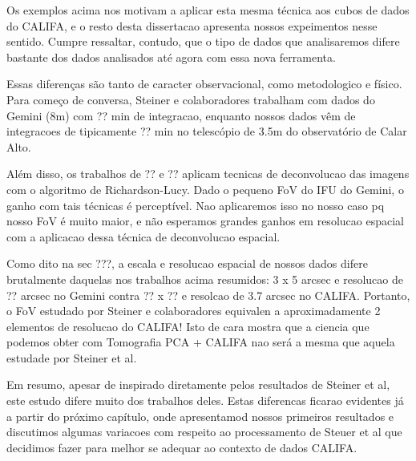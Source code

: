Os exemplos acima nos motivam a aplicar esta mesma técnica aos cubos de dados do CALIFA, e o resto desta dissertacao apresenta nossos expeimentos nesse sentido. Cumpre ressaltar, contudo, que o tipo de dados que analisaremos difere bastante dos dados analisados até agora com essa nova ferramenta. 


Essas diferenças são tanto de caracter observacional, como metodologico e físico. Para começo de conversa, Steiner e colaboradores trabalham com dados do Gemini (8m) com ?? min de integracao, enquanto nossos dados vêm de integracoes de tipicamente ?? min no telescópio de 3.5m do observatório de Calar Alto. 

Além disso, os trabalhos de ?? e ?? aplicam tecnicas de deconvolucao das imagens com o algoritmo de Richardson-Lucy. Dado o pequeno FoV do IFU do Gemini, o ganho com tais técnicas é perceptível. Nao aplicaremos isso no nosso caso pq nosso FoV é muito maior, e não esperamos grandes ganhos em resolucao espacial com a aplicacao dessa técnica de deconvolucao espacial.

Como dito na sec ???, a escala e resolucao espacial de nossos dados difere brutalmente daquelas nos trabalhos acima resumidos: 3 x 5 arcsec e resolucao de ?? arcsec no Gemini contra ?? x ?? e resolcao de 3.7 arcsec no CALIFA. Portanto, o FoV estudado por Steiner e colaboradores equivalen a aproximadamente 2 elementos de resolucao do CALIFA! Isto de cara mostra que a ciencia que podemos obter com Tomografia PCA + CALIFA  nao será a mesma que aquela estudade por Steiner et al.

Em resumo, apesar de inspirado diretamente pelos resultados de Steiner et al, este estudo difere muito dos trabalhos deles. Estas diferencas ficarao evidentes já a partir do próximo capítulo, onde apresentamod nossos primeiros resultados e discutimos algumas variacoes com respeito ao processamento de Steuer et al que decidimos fazer para melhor se adequar ao contexto de dados CALIFA.

